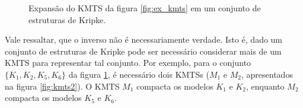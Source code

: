 \documentclass[normaltoc,capchap,capsec,times]{abnt}
\begin{document}
\begin{figure}[htb]
\begin{center}
{
}
\end{center}
\centering \caption[Expansão do KMTS da figura \ref{fig:ex_kmts} em um conjunto de estruturas
de Kripke]{Expansão do KMTS da figura \ref{fig:ex_kmts} em um conjunto de estruturas de Kripke.}
\label{fig:conjunto_kripke}
\end{figure}

Vale ressaltar, que o inverso não é necessariamente verdade. Isto é, dado um conjunto de estruturas de Kripke pode ser necessário considerar mais de um KMTS para representar tal conjunto. Por exemplo, para o conjunto \mbox{$\{K_1, K_2, K_5, K_6\}$} da figura \ref{fig:conjunto_kripke}, é necessário dois KMTSs ($M_1$ e $M_2$, apresentados na figura \ref{fig:kmts2}). O KMTS $M_1$ compacta os modelos $K_1$ e $K_2$, enquanto $M_2$ compacta os modelos $K_5$ e $K_6$.
\end{document}
